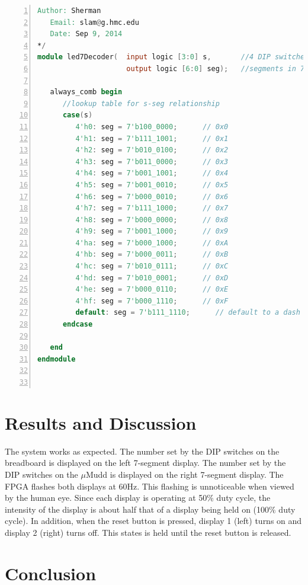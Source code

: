 \documentclass[11pt]{article}
\begin{document}
\begin{lstlisting}[language=Verilog,numbers=left,basicstyle=\footnotesize]
   Author: Sherman
   Email: slam@g.hmc.edu
   Date: Sep 9, 2014
*/
module led7Decoder(  input logic [3:0] s,       //4 DIP switches
                     output logic [6:0] seg);   //segments in 7-seg display
                     
   always_comb begin
      //lookup table for s-seg relationship
      case(s)
         4'h0: seg = 7'b100_0000;      // 0x0
         4'h1: seg = 7'b111_1001;      // 0x1
         4'h2: seg = 7'b010_0100;      // 0x2
         4'h3: seg = 7'b011_0000;      // 0x3
         4'h4: seg = 7'b001_1001;      // 0x4
         4'h5: seg = 7'b001_0010;      // 0x5
         4'h6: seg = 7'b000_0010;      // 0x6
         4'h7: seg = 7'b111_1000;      // 0x7
         4'h8: seg = 7'b000_0000;      // 0x8
         4'h9: seg = 7'b001_1000;      // 0x9
         4'ha: seg = 7'b000_1000;      // 0xA
         4'hb: seg = 7'b000_0011;      // 0xB
         4'hc: seg = 7'b010_0111;      // 0xC
         4'hd: seg = 7'b010_0001;      // 0xD
         4'he: seg = 7'b000_0110;      // 0xE
         4'hf: seg = 7'b000_1110;      // 0xF
         default: seg = 7'b111_1110;      // default to a dash
      endcase
      
   end
endmodule



\end{lstlisting}


\clearpage

\section{Results and Discussion}

The system works as expected. The number set by the DIP switches on the breadboard is displayed on the left 7-segment display. The number set by the DIP switches on the $\mu$Mudd is displayed on the right 7-segment display. The FPGA flashes both displays at 60Hz. This flashing is unnoticeable when viewed by the human eye. Since each display is operating at 50$\%$ duty cycle, the intensity of the display is about half that of a display being held on (100$\%$ duty cycle). In addition, when the reset button is pressed, display 1 (left) turns on and display 2 (right) turns off. This states is held until the reset button is released.  \\


\section{Conclusion}
\end{document}
